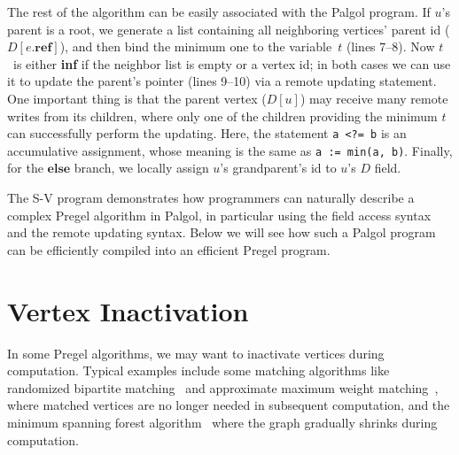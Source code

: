 \documentclass{sokendai_thesis} %
\begin{document}
The rest of the algorithm can be easily associated with the Palgol program.
If $u$'s parent is a root, we generate a list containing all neighboring vertices' parent id ($D[e.\mathbf{ref}]$), and then bind the minimum one to the variable~$t$ (lines 7--8).
Now $t$~is either \textbf{inf} if the neighbor list is empty or a vertex id; in both cases we can use it to update the parent's pointer (lines 9--10) via a remote updating statement.
One important thing is that the parent vertex ($D[u]$) may receive many remote writes from its children, where only one of the children providing the minimum $t$ can successfully perform the updating.
Here, the statement \texttt{a <?= b} is an accumulative assignment, whose meaning is the same as \texttt{a := min(a, b)}.
Finally, for the $\mathbf{else}$ branch, we locally assign $u$'s grandparent's id to $u$'s $D$ field.

The S-V program demonstrates how programmers can naturally describe a complex Pregel algorithm in Palgol, in particular using the field access syntax and the remote updating syntax.
%
Below we will see how such a Palgol program 
can be efficiently compiled into an efficient Pregel program.

\section{Vertex Inactivation}

In some Pregel algorithms, we may want to inactivate vertices during computation.
Typical examples include some matching algorithms like randomized bipartite matching~\cite{pregel} and approximate maximum weight matching~\cite{optimizing}, where matched vertices are no longer needed in subsequent computation, and the minimum spanning forest algorithm~\cite{optimizing} where the graph gradually shrinks during computation.
\end{document}
